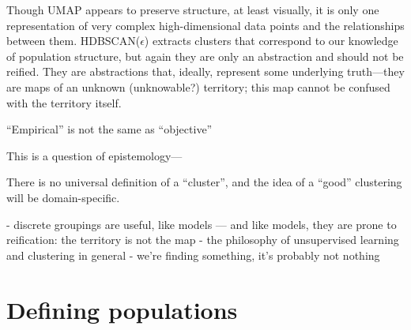 Though UMAP appears to preserve structure, at least visually, it is only one representation of very complex high-dimensional data points and the relationships between them. HDBSCAN($\hat{\epsilon}$) extracts clusters that correspond to our knowledge of population structure, but again they are only an abstraction and should not be reified. They are abstractions that, ideally, represent some underlying truth---they are maps of an unknown (unknowable?) territory; this map cannot be confused with the territory itself. 



``Empirical'' is not the same as ``objective''

\citep{lewis_human_2012}

This is a question of epistemology---

There is no universal definition of a ``cluster'', and the idea of a ``good'' clustering will be domain-specific\citep{hennig_what_2015}.

- discrete groupings are useful, like models --- and like models, they are prone to reification: the territory is not the map
- the philosophy of unsupervised learning and clustering in general
- we're finding something, it's probably not nothing


\clearpage

\section{Defining populations}

